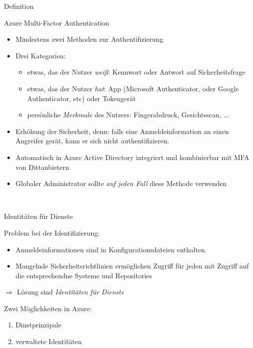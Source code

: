 \documentclass{scrartcl}
\newenvironment{flashcard}[2][]{%
    #1
    \vfill
    \centerline{\Large{#2}}
    \vfill
    \newpage
}
{\newpage}
\begin{document}
    \begin{flashcard}[Definition]{Azure Multi-Factor Authentication}
        \begin{itemize}
            \item Mindestens zwei Methoden zur Authentifizierung
            \item Drei Kategorien:
                \begin{itemize}
                    \item etwas, das der Nutzer \emph{weiß}: Kennwort oder Antwort auf Sicherheitsfrage
                    \item etwas, das der Nutzer \emph{hat}: App (Microsoft Authenticator, oder Google Authenticator, etc) oder Tokengerät
                    \item persönliche \emph{Merkmale} des Nutzers: Fingerabdruck, Gesichtsscan, ...
            \end{itemize}
            \item Erhöhung der Sicherheit, denn: falls eine Anmeldeinformation an einen Angreifer gerät, kann er sich nicht authentifizieren.
            \item Automatisch in Azure Active Directory integriert und kombinierbar mit MFA von Dittanbietern
            \item Globaler Administrator sollte \emph{auf jeden Fall} diese Methode verwenden
        \end{itemize}
    \end{flashcard}

    \begin{flashcard}[\ ]{Identitäten für Dienste}
            Problem bei der Identifizierung:
            \begin{itemize}
                \item Anmeldeinformationen sind in Konfigurationsdateien enthalten.
                \item Mangelnde Sicherheitsrichtlinien ermöglichen Zugriff für jeden mit Zugriff auf die entsprechendne Systeme und Repositories
            \end{itemize}
            $\Rightarrow$ Lösung sind \emph{Identitäten für Dienste}

            Zwei Möglichkeiten in Azure:
            \begin{enumerate}
                \item Dinstprinzipale
                \item verwaltete Identitäten
            \end{enumerate}
    \end{flashcard}
\end{document}
